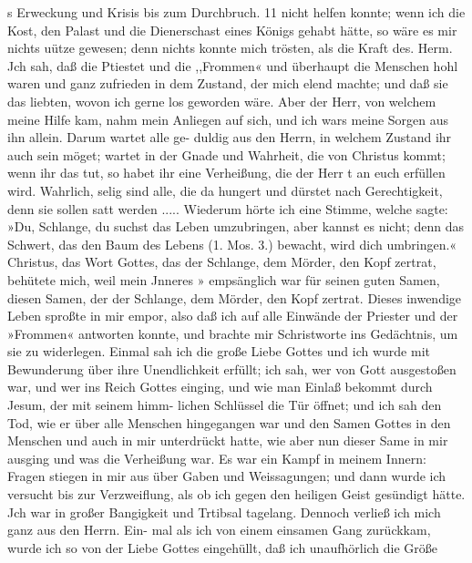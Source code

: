 s Erweckung und Krisis bis zum Durchbruch. 11
nicht helfen konnte; wenn ich die Kost, den Palast und die
Dienerschast eines Königs gehabt hätte, so wäre es mir nichts
uütze gewesen; denn nichts konnte mich trösten, als die Kraft
des. Herm. Jch sah, daß die Ptiestet und die ,,Frommen«
und überhaupt die Menschen hohl waren und ganz zufrieden
in dem Zustand, der mich elend machte; und daß sie das
liebten, wovon ich gerne los geworden wäre. Aber der Herr,
von welchem meine Hilfe kam, nahm mein Anliegen auf sich, und
ich wars meine Sorgen aus ihn allein. Darum wartet alle ge-
duldig aus den Herrn, in welchem Zustand ihr auch sein möget;
wartet in der Gnade und Wahrheit, die von Christus kommt;
wenn ihr das tut, so habet ihr eine Verheißung, die der Herr t
an euch erfüllen wird. Wahrlich, selig sind alle, die da hungert
und dürstet nach Gerechtigkeit, denn sie sollen satt werden .....
Wiederum hörte ich eine Stimme, welche sagte: »Du, Schlange,
du suchst das Leben umzubringen, aber kannst es nicht; denn das
Schwert, das den Baum des Lebens (1. Mos. 3.) bewacht, wird
dich umbringen.« Christus, das Wort Gottes, das der Schlange,
dem Mörder, den Kopf zertrat, behütete mich, weil mein Jnneres »
empsänglich war für seinen guten Samen, diesen Samen, der der
Schlange, dem Mörder, den Kopf zertrat. Dieses inwendige
Leben sproßte in mir empor, also daß ich auf alle Einwände der
Priester und der »Frommen« antworten konnte, und brachte mir
Schristworte ins Gedächtnis, um sie zu widerlegen.
Einmal sah ich die große Liebe Gottes und ich wurde mit
Bewunderung über ihre Unendlichkeit erfüllt; ich sah, wer von
Gott ausgestoßen war, und wer ins Reich Gottes einging, und
wie man Einlaß bekommt durch Jesum, der mit seinem himm-
lichen Schlüssel die Tür öffnet; und ich sah den Tod, wie er
über alle Menschen hingegangen war und den Samen Gottes in
den Menschen und auch in mir unterdrückt hatte, wie aber nun
dieser Same in mir ausging und was die Verheißung war. Es
war ein Kampf in meinem Innern: Fragen stiegen in mir
aus über Gaben und Weissagungen; und dann wurde ich
versucht bis zur Verzweiflung, als ob ich gegen den heiligen Geist
gesündigt hätte. Jch war in großer Bangigkeit und Trtibsal
tagelang. Dennoch verließ ich mich ganz aus den Herrn. Ein-
mal als ich von einem einsamen Gang zurückkam, wurde ich so
von der Liebe Gottes eingehüllt, daß ich unaufhörlich die Größe


